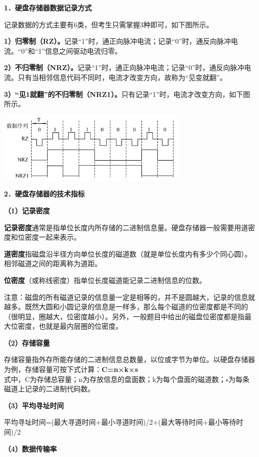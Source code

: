 \textbf{{1．硬盘存储器数据记录方式}}

记录数据的方式主要有6类，但考生只需掌握3种即可，如下图所示。

\textbf{1）归零制（RZ）。}记录``1''时，通正向脉冲电流；记录``0''时，通反向脉冲电流。``0''和``1''信息之间驱动电流归零。

\textbf{2）不归零制（NRZ）。}记录``1''时，通正向脉冲电流；记录``0''时，通反向脉冲电流。只有当相邻信息代码不同时，电流才改变方向，故称为``见变就翻''。

\textbf{3）``见1就翻''的不归零制（NRZ1）。}只有记录``1''时，电流才改变方向，如下图所示。

\includegraphics[width=3.65625in,height=1.34375in]{png-jpeg-pics/314EA0D1735F7CA96067628202722D32.png}

\textbf{{2．硬盘存储器的技术指标}}

\textbf{（1）记录密度}

\textbf{记录密度}通常{是指单位长度内所存储的二进制信息量}。硬盘存储器一般需要用道密度和位密度一起来表示。

\textbf{道密度}指磁盘沿半径方向单位长度的磁道数（就是单位长度内有多少个同心圆）。相邻磁道之间的距离称为道距。

\textbf{位密度}（或称线密度）指单位长度磁道能记录二进制信息的位数。

{注意：磁盘的所有磁道记录的信息量一定是相等的，并不是圆越大，记录的信息就越多。既然大圆和小圆记录的信息是一样多，那么每个磁道的位密度都是不同的（很明显，圈越大，位密度越小）。另外，一般题目中给出的磁盘位密度都是指最大位密度，也就是最内层圈的位密度。}

\textbf{（2）存储容量}

存储容量指外存所能存储的二进制信息总数量，以位或字节为单位。以硬盘存储器为例，存储容量可按下式计算：\textbf{C=n×k×s}\\
式中，C为存储总容量；n为存放信息的盘面数；k为每个盘面的磁道数；s为每条磁道上记录的二进制代码数。

\textbf{（3）平均寻址时间}

{平均寻址时间=(最大寻道时间+最小寻道时间)/2+(最大等待时间+最小等待时间)/2}

\textbf{（4）数据传输率}

